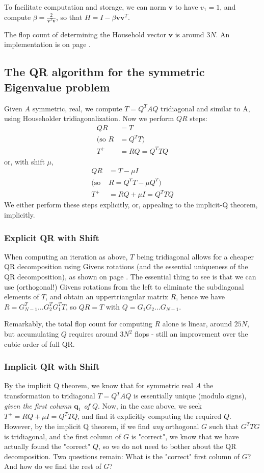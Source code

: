 \documentclass[11pt]{article}
\newcommand{\ve}[1]{\ensuremath{\mathbf{#1}}}
\begin{document}
To facilitate computation and storage, we can norm \ve v to have $v_1=1$, and compute $\beta = \frac 2{\ve v^T \ve v}$, so that $H = I - \beta \ve v \ve v^T$.

The flop count of determining the Household vector \ve v is around $3N$. An implementation is on page \pageref{rc:house}.

\subsection{The QR algorithm for the symmetric Eigenvalue problem}

Given $A$ symmetric, real, we compute $T=Q^T AQ$ tridiagonal and similar to A, using Householder tridiagonalization. Now we perform $QR$ steps:
\begin{align*}
QR&=T  \\
(\text{so }  R &= Q^T T)\\
T^+ &= RQ = Q^T TQ
\end{align*}
or, with shift $\mu$,
\begin{align*}
QR&=T - \mu I \\ 
(\text{so }  &R  = Q^T T - \mu Q^T)\\
T^+ &= RQ + \mu I = Q^T TQ
\end{align*}
We either perform these steps explicitly, or, appealing to the implicit-Q theorem, implicitly.
\subsubsection{Explicit QR with Shift}
When computing an iteration as above, $T$ being tridiagonal allows for a cheaper QR decomposition using Givens rotations (and the essential uniqueness of the QR decomposition), as shown on page \pageref{ml:qrsymtrid}. The essential thing to see is that we can use (orthogonal!) Givens rotations from the left to eliminate the subdiagonal elements of $T$, and obtain an uppertriangular matrix $R$, hence we have $R = G_{N-1}^T\ldots G_2^T G_1^T T$, so $QR=T$ with $Q=G_1 G_2\ldots G_{N-1}$. 

Remarkably, the total flop count for computing $R$ alone is linear, around $25N$, but accumulating $Q$ requires around $3N^2$ flops - still an improvement over the cubic order of full QR.



\subsubsection{Implicit QR with Shift}
By the implicit Q theorem, we know that for symmetric real $A$ the transformation to tridiagonal $T = Q^T A Q$ is essentially unique (modulo signs), \emph{given the first column $\ve q_1$ of $Q$}. Now, in the case above, we seek $T^+ = RQ + \mu I = Q^T TQ$, and find it explicitly computing the required $Q$. However, by the implicit Q theorem, if we find \emph{any} orthogonal $G$ such that $G^T T G$ is tridiagonal, and the first column of $G$ is "correct", we know that we have actually found the "correct" $Q$, so we do not need to bother about the QR decomposition. Two questions remain: What is the "correct" first column of $G$? And how do we find the rest of $G$?
\end{document}

